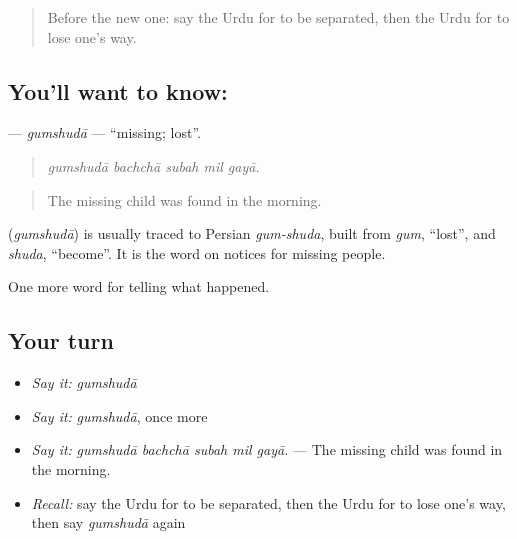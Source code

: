 \label{lesson:UR-C298-gumshuda}



\begin{quote}
Before the new one: say the Urdu for to be separated, then the Urdu for to lose one's way.
\end{quote}

\subsection*{You'll want to know: }
\textbf{} — \emph{gumshudā} — \textquotedblleft{}missing; lost\textquotedblright{}.

\begin{quote}
    
\end{quote}

\begin{quote}
\emph{gumshudā bachchā subah mil gayā.}
\end{quote}

\begin{quote}
The missing child was found in the morning.
\end{quote}

\begin{cousinweb}
\textbf{} (\emph{gumshudā}) is usually traced to Persian \emph{gum-shuda}, built from \emph{gum}, \textquotedblleft{}lost\textquotedblright{}, and \emph{shuda}, \textquotedblleft{}become\textquotedblright{}. It is the word on notices for missing people.
\end{cousinweb}

\begin{grammarlens}[title={What you've built}]
One more word for telling what happened.
\end{grammarlens}

\subsection*{Your turn}
\begin{itemize}
\raggedright
  \item \emph{Say it:} \emph{gumshudā}
  \item \emph{Say it:} \emph{gumshudā}, once more
  \item \emph{Say it:} \emph{gumshudā bachchā subah mil gayā.} — The missing child was found in the morning.
  \item \emph{Recall:} say the Urdu for to be separated, then the Urdu for to lose one's way, then say \emph{gumshudā} again
\end{itemize}

